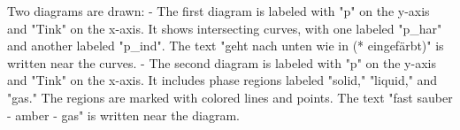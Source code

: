 Two diagrams are drawn:  
- The first diagram is labeled with "p" on the y-axis and "Tink" on the x-axis. It shows intersecting curves, with one labeled "p_har" and another labeled "p_ind". The text "geht nach unten wie in (* eingefärbt)" is written near the curves.  
- The second diagram is labeled with "p" on the y-axis and "Tink" on the x-axis. It includes phase regions labeled "solid," "liquid," and "gas." The regions are marked with colored lines and points. The text "fast sauber - amber - gas" is written near the diagram.